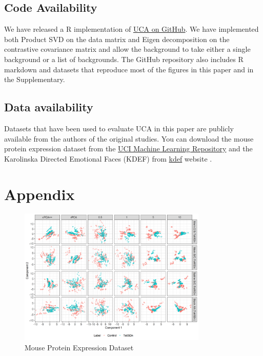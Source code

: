 \documentclass[12pt]{article}
\begin{document}
 \subsection{Code Availability}
 We have released a R implementation of \href{https://github.com/rtud2/Residual-Dimension-Reduction/tree/master/uca}{UCA on GitHub}. We have implemented both Product SVD on the data matrix and Eigen decomposition on the contrastive covariance matrix and allow the background to take either a single background or a list of backgrounds. The GitHub repository also includes R markdown and datasets that reproduce most of the figures in this paper and in the Supplementary.
 
 \subsection{Data availability}
 Datasets that have been used to evaluate UCA in this paper are publicly available from the authors of the original studies. You can download the mouse protein expression dataset from the \href{https://archive.ics.uci.edu/ml/datasets/Mice+Protein+Expression}{UCI Machine Learning Repository} \cite{Higuera} and the Karolinska Directed Emotional Faces (KDEF) from \href{https://kdef.se/}{kdef} website  \cite{Calvo2008}.
 
{}

\section{Appendix}
\begin{figure}[!ht]
    \centering
	\includegraphics[width = 0.8\textwidth]{figure/Mouse_stack_cpc_rpcTs65Dn.png}
	\caption{Mouse Protein Expression Dataset}
	\label{fig:mouse_stack_cpca}
\end{figure}
\end{document}
